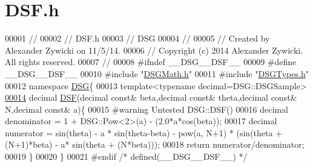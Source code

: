 \hypertarget{_d_s_f_8h_source}{\section{D\+S\+F.\+h}
\label{_d_s_f_8h_source}
}

\begin{DoxyCode}
00001 \textcolor{comment}{//}
00002 \textcolor{comment}{//  DSF.h}
00003 \textcolor{comment}{//  DSG}
00004 \textcolor{comment}{//}
00005 \textcolor{comment}{//  Created by Alexander Zywicki on 11/5/14.}
00006 \textcolor{comment}{//  Copyright (c) 2014 Alexander Zywicki. All rights reserved.}
00007 \textcolor{comment}{//}
00008 \textcolor{preprocessor}{#ifndef \_\_DSG\_\_DSF\_\_}
00009 \textcolor{preprocessor}{#define \_\_DSG\_\_DSF\_\_}
00010 \textcolor{preprocessor}{#include "\hyperlink{_d_s_g_math_8h}{DSGMath.h}"}
00011 \textcolor{preprocessor}{#include "\hyperlink{_d_s_g_types_8h}{DSGTypes.h}"}
00012 \textcolor{keyword}{namespace }\hyperlink{namespace_d_s_g}{DSG}\{
00013     \textcolor{keyword}{template}<\textcolor{keyword}{typename} decimal=DSG::DSGSample>
\hypertarget{_d_s_f_8h_source_l00014}{}\hyperlink{namespace_d_s_g_aac6959add6359f512191ddcd17fd6373}{00014}     decimal \hyperlink{namespace_d_s_g_aac6959add6359f512191ddcd17fd6373}{DSF}(decimal \textcolor{keyword}{const}& beta,decimal \textcolor{keyword}{const}& theta,decimal \textcolor{keyword}{const}& N,decimal \textcolor{keyword}{const}& a)\{
00015 \textcolor{preprocessor}{#warning Untested DSG::DSF()}
00016         decimal denominator = 1 + DSG::Pow<2>(a) - (2.0*a*cos(beta));
00017         decimal numerator = sin(theta) - a * sin(theta-beta) - pow(a, N+1) * (sin(theta + (N+1)*beta) - a*
      sin(theta + (N*beta)));
00018         \textcolor{keywordflow}{return} numerator/denominator;
00019     \}
00020 \}
00021 \textcolor{preprocessor}{#endif }\textcolor{comment}{/* defined(\_\_DSG\_\_DSF\_\_) */}\textcolor{preprocessor}{}
\end{DoxyCode}
